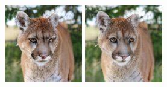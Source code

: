\begin{figure}[h]
\begin{minipage}{0.15\textwidth}
    \end{minipage}
    \begin{minipage}{0.15\textwidth}
        \centering
        \includegraphics[width=\linewidth]{material/65k/224.png}
    \end{minipage}
    \begin{minipage}{0.15\textwidth}
        \centering
        \includegraphics[width=\linewidth]{material/262k/224.png}
    \end{minipage}


\end{figure}
